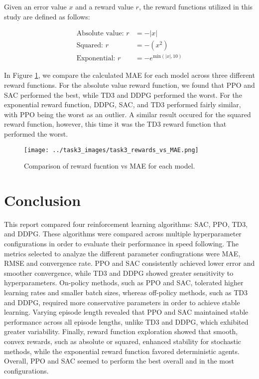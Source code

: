 \documentclass[11pt]{article}
\begin{document}
Given an error value $x$ and a reward value $r$, the reward functions utilized in this study are defined as follows:

\begin{align}
\text{Absolute value:  } r &= -|x| \\
\text{Squared: } r &= -(x^2) \\
\text{Exponential: } r &= -e^{\text{min}(|x|, 10)}
\end{align}

In Figure \ref{fig:reward_vs_mae}, we compare the calculated MAE for each model across three different reward functions. For the absolute value reward function, we found that PPO and SAC performed the best, while TD3 and DDPG performed the worst. For the exponential reward function, DDPG, SAC, and TD3 performed fairly similar, with PPO being the worst as an outlier. A similar result occured for the squared reward function, however, this time it was the TD3 reward function that performed the worst.

\begin{figure}[h!]
  \centering
  \texttt{[image: ../task3\_images/task3\_rewards\_vs\_MAE.png]}
  \caption{Comparison of reward fucntion vs MAE for each model.}
  \label{fig:reward_vs_mae}
\end{figure}

\newpage
\section{Conclusion}

This report compared four reinforcement learning algorithms: SAC, PPO, TD3, and DDPG. These algorithms were compared across multiple hyperparameter configurations in order to evaluate their performance in speed following. The metrics selected to analyze the different parameter confiugrations were MAE, RMSE and convergence rate. PPO and SAC consistently achieved lower error and smoother convergence, while TD3 and DDPG showed greater sensitivity to hyperparameters. On-policy methods, such as PPO and SAC, tolerated higher learning rates and smaller batch sizes, whereas off-policy methods, such as TD3 and DDPG, required more conservative parameters in order to achieve stable learning. Varying episode length revealed that PPO and SAC maintained stable performance across all episode lengths, unlike TD3 and DDPG, which exhibited greater variability. Finally, reward function exploration showed that smooth, convex rewards, such as absolute or squared, enhanced stability for stochastic methods, while the exponential reward function favored deterministic agents. Overall, PPO and SAC seemed to perform the best overall and in the most configurations.
\end{document}
